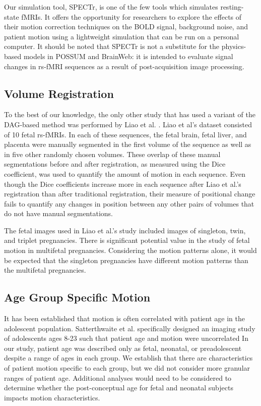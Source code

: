 Our simulation tool, SPECTr, is one of the few tools which simulates resting-state fMRIs. It offers the opportunity for researchers to explore the effects of their motion correction techniques on the BOLD signal, background noise, and patient motion using a lightweight simulation that can be run on a personal computer. It should be noted that SPECTr is not a substitute for the physics-based models in POSSUM and BrainWeb: it is intended to evaluate signal changes in rs-fMRI sequences as a result of post-acquisition image processing.

\subsection{Volume Registration} 

To the best of our knowledge, the only other study that has used a variant of the DAG-based method was performed by Liao et al. \cite{Liao2016}. Liao et al’s dataset consisted of 10 fetal rs-fMRIs. In each of these sequences, the fetal brain, fetal liver, and placenta were manually segmented in the first volume of the sequence as well as in five other randomly chosen volumes. These overlap of these manual segmentations before and after registration, as measured using the Dice coefficient, was used to quantify the amount of motion in each sequence. Even though the Dice coefficients increase more in each sequence after Liao et al.’s registration than after traditional registration, their measure of positional change fails to quantify any changes in position between any other pairs of volumes that do not have manual segmentations. 

The fetal images used in Liao et al.'s study included images of singleton, twin, and triplet pregnancies. There is significant potential value in the study of fetal motion in multifetal pregnancies. Considering the motion patterns alone, it would be expected that the singleton pregnancies have different motion patterns than the multifetal pregnancies.

\subsection{Age Group Specific Motion}

It has been established that motion is often correlated with patient age in the adolescent population. Satterthwaite et al. specifically designed an imaging study of adolescents ages 8-23 such that patient age and motion were uncorrelated \cite{Satterthwaite2012} %
In our study, patient age was described only as fetal, neonatal, or preadolescent despite a range of ages in each group. We establish that there are characteristics of patient motion specific to each group, but we did not consider more granular ranges of patient age. Additional analyses would need to be considered to determine whether the post-conceptual age for fetal and neonatal subjects impacts motion characteristics. 

